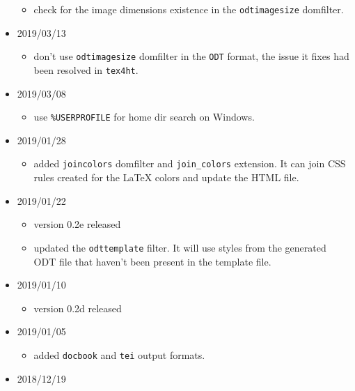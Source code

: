 \begin{itemize}
  \begin{itemize}
  \tightlist
  \item
    check for the image dimensions existence in the
    \texttt{odtimagesize} domfilter.
  \end{itemize}
\item
  2019/03/13

  \begin{itemize}
  \tightlist
  \item
    don't use \texttt{odtimagesize} domfilter in the \texttt{ODT}
    format, the issue it fixes had been resolved in \texttt{tex4ht}.
  \end{itemize}
\item
  2019/03/08

  \begin{itemize}
  \tightlist
  \item
    use \texttt{\%USERPROFILE} for home dir search on Windows.
  \end{itemize}
\item
  2019/01/28

  \begin{itemize}
  \tightlist
  \item
    added \texttt{joincolors} domfilter and \texttt{join\_colors}
    extension. It can join CSS rules created for the LaTeX colors and
    update the HTML file.
  \end{itemize}
\item
  2019/01/22

  \begin{itemize}
  \tightlist
  \item
    version 0.2e released
  \item
    updated the \texttt{odttemplate} filter. It will use styles from the
    generated ODT file that haven't been present in the template file.
  \end{itemize}
\item
  2019/01/10

  \begin{itemize}
  \tightlist
  \item
    version 0.2d released
  \end{itemize}
\item
  2019/01/05

  \begin{itemize}
  \tightlist
  \item
    added \texttt{docbook} and \texttt{tei} output formats.
  \end{itemize}
\item
  2018/12/19


\end{itemize}
